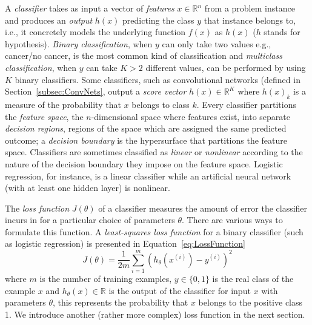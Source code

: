 A \emph{classifier} takes as input a vector of \emph{features} $x \in \mathbb{R}^n$ from a problem instance and produces an \emph{output} $h(x)$ predicting the class $y$ that instance belongs to, i.e., it concretely models the underlying function $f(x)$ as $h(x)$ ($h$ stands for hypothesis). \emph{Binary classification}, when $y$ can only take two values e.g., cancer/no cancer, is the most common kind of classification and \emph{multiclass classification}, when $y$ can take $K > 2$ different values, can be performed by using $K$ binary classifiers. Some classifiers, such as convolutional networks (defined in Section~\ref{subsec:ConvNets}, output a \emph{score vector} $h(x) \in \mathbb{R}^K$ where $h(x)_k$ is a measure of the probability that $x$ belongs to class $k$. Every classifier partitions the \emph{feature space}, the $n$-dimensional space where features exist, into separate \emph{decision regions}, regions of the space which are assigned the same predicted outcome; a \emph{decision boundary} is the hypersurface that partitions the feature space. Classifiers are sometimes classified as \emph{linear} or \emph{nonlinear} according to the nature of the decision boundary they impose on the feature space. Logistic regression, for instance, is a linear classifier while an artificial neural network (with at least one hidden layer) is nonlinear.

The \emph{loss function} $J(\theta)$ of a classifier measures the amount of error the classifier incurs in for a particular choice of parameters $\theta$. There are various ways to formulate this function. A \emph{least-squares loss function} for a binary classifier (such as logistic regression) is presented in Equation~\ref{eq:LossFunction}
\begin{equation}
	J(\theta) = \frac{1}{2m}\sum_{i=1}^m(h_\theta(x^{(i)}) - y^{(i)})^2
	\label{eq:LossFunction}
\end{equation}
where $m$ is the number of training examples, $y \in \{0,1\}$ is the real class of the example $x$ and $h_\theta(x) \in \mathbb{R}$ is the output of the classifier for input $x$ with parameters $\theta$, this represents the probability that $x$ belongs to the positive class 1. We introduce another (rather more complex) loss function in the next section.

